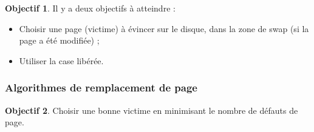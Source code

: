 \documentclass[11pt,english,french]{scrreprt}
\theoremstyle{remark}
\theoremstyle{definition}
\newtheorem*{obj*}{Objectif}
\begin{document}
\begin{obj*}
	Il y a deux objectifs à atteindre :\begin{itemize}
		\item Choisir une page (victime) à évincer sur le disque, dans la zone de swap (si la page a été modifiée) ;
		\item Utiliser la case libérée.
	\end{itemize} 
\end{obj*}

\subsubsection{Algorithmes de remplacement de page}
\begin{obj*}
	Choisir une bonne victime en minimisant le nombre de défauts de page.
\end{obj*} 
\end{document}
